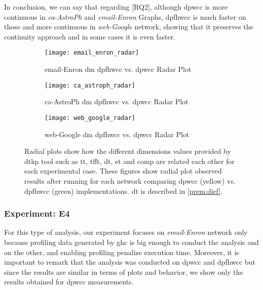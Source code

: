 In conclusion, we can say that regarding [RQ2], although \acrshort{dpwcc} is more continuous in \emph{ca-AstroPh} and \emph{email-Enron} Graphs, \acrshort{dpfhwcc} is much faster on those and more continuous in \emph{web-Google} network, showing that it preserves the continuity approach and in some cases it is even faster.

 \begin{figure}[h!]
  \centering
  \begin{subfigure}[t]{0.3\textwidth}
   \texttt{[image: email\_enron\_radar]}
   \caption{email-Enron \acrlong{dm} \acrshort{dpfhwcc} vs. \acrshort{dpwcc} Radar Plot}
    \label{fig:dief:rad:new:1}
  \end{subfigure}\hfill
  \begin{subfigure}[t]{0.3\textwidth}
   \texttt{[image: ca\_astroph\_radar]}
   \caption{ca-AstroPh \acrlong{dm} \acrshort{dpfhwcc} vs. \acrshort{dpwcc} Radar Plot}
    \label{fig:dief:rad:new:2}
  \end{subfigure}\hfill
  \begin{subfigure}[t]{0.3\textwidth}
   \texttt{[image: web\_google\_radar]}
   \caption{web-Google \acrlong{dm} \acrshort{dpfhwcc} vs. \acrshort{dpwcc} Radar Plot}
    \label{fig:dief:rad:new:3}
  \end{subfigure}\hfill
   \caption{Radial plots show how the different dimensions values provided by \acrshort{dtkp} tool such as \acrshort{tt}, \acrshort{tfft}, \acrshort{dt}, \acrshort{et} and \acrshort{comp} are related each other for each experimental case. These figures show radial plot observed results after running for each network comparing \acrshort{dpwcc} (yellow) vs. \acrshort{dpfhwcc} (green) implementations. \acrshort{dt} is described in \autoref{prem:dief}.}
   \label{fig:dief:radial:all}
 \end{figure}

\subsubsection{Experiment: E4}
For this type of analysis, our experiment focuses on \emph{email-Enron} network  only because profiling data generated by \acrshort{ghc} is big enough to conduct the analysis and on the other, and enabling profiling penalize execution time.
Moreover, it is important to remark that the analysis was conducted on \acrshort{dpwcc} and \acrshort{dpfhwcc} but since the results are similar in terms of plots and behavior, we show only the results obtained for \acrshort{dpwcc} measurements.

